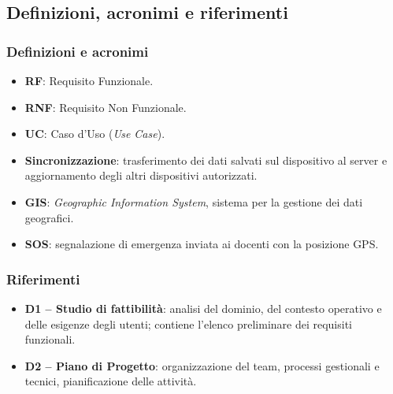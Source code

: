 \subsection{Definizioni, acronimi e riferimenti}

\subsubsection*{Definizioni e acronimi}
\begin{itemize}
    \item \textbf{RF}: Requisito Funzionale.
    \item \textbf{RNF}: Requisito Non Funzionale.
    \item \textbf{UC}: Caso d'Uso (\emph{Use Case}).
    \item \textbf{Sincronizzazione}: trasferimento dei dati salvati sul dispositivo al server e aggiornamento degli altri dispositivi autorizzati.
    \item \textbf{GIS}: \emph{Geographic Information System}, sistema per la gestione dei dati geografici.
    \item \textbf{SOS}: segnalazione di emergenza inviata ai docenti con la posizione GPS.
\end{itemize}

\subsubsection*{Riferimenti}
\begin{itemize}
    \item \textbf{D1 -- Studio di fattibilità}: analisi del dominio, del contesto operativo e delle esigenze degli utenti; contiene l'elenco preliminare dei requisiti funzionali.
    \item \textbf{D2 -- Piano di Progetto}: organizzazione del team, processi gestionali e tecnici, pianificazione delle attività.
\end{itemize}

